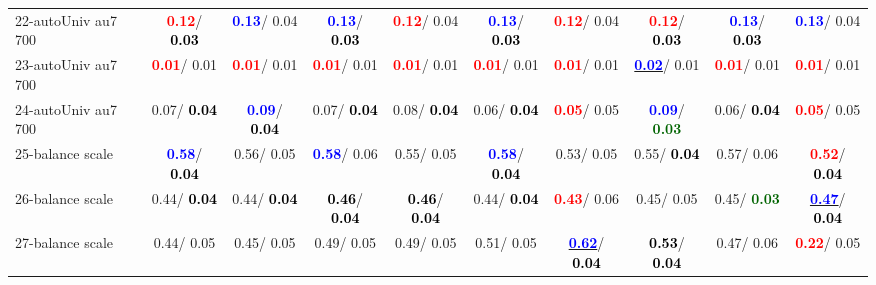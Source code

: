 \begin{table}[h]
\begin{center}
{\begin{tabular}{lc|c|c|c|c|c|c|c|c}
22-autoUniv au7 700 & \textcolor{red}{\textbf{  0.12}}/\textcolor{black}{\textbf{  0.03}} & \textcolor{blue}{\textbf{  0.13}}/  0.04 & \textcolor{blue}{\textbf{  0.13}}/\textcolor{black}{\textbf{  0.03}} & \textcolor{red}{\textbf{  0.12}}/  0.04 & \textcolor{blue}{\textbf{  0.13}}/\textcolor{black}{\textbf{  0.03}} & \textcolor{red}{\textbf{  0.12}}/  0.04 & \textcolor{red}{\textbf{  0.12}}/\textcolor{black}{\textbf{  0.03}} & \textcolor{blue}{\textbf{  0.13}}/\textcolor{black}{\textbf{  0.03}} & \textcolor{blue}{\textbf{  0.13}}/  0.04 \\
23-autoUniv au7 700 & \textcolor{red}{\textbf{  0.01}}/  0.01 & \textcolor{red}{\textbf{  0.01}}/  0.01 & \textcolor{red}{\textbf{  0.01}}/  0.01 & \textcolor{red}{\textbf{  0.01}}/  0.01 & \textcolor{red}{\textbf{  0.01}}/  0.01 & \textcolor{red}{\textbf{  0.01}}/  0.01 & \underline{\textcolor{blue}{\textbf{  0.02}}}/  0.01 & \textcolor{red}{\textbf{  0.01}}/  0.01 & \textcolor{red}{\textbf{  0.01}}/  0.01 \\
24-autoUniv au7 700 &   0.07/\textcolor{black}{\textbf{  0.04}} & \textcolor{blue}{\textbf{  0.09}}/\textcolor{black}{\textbf{  0.04}} &   0.07/\textcolor{black}{\textbf{  0.04}} &   0.08/\textcolor{black}{\textbf{  0.04}} &   0.06/\textcolor{black}{\textbf{  0.04}} & \textcolor{red}{\textbf{  0.05}}/  0.05 & \textcolor{blue}{\textbf{  0.09}}/\textcolor{darkgreen}{\textbf{  0.03}} &   0.06/\textcolor{black}{\textbf{  0.04}} & \textcolor{red}{\textbf{  0.05}}/  0.05 \\
25-balance scale & \textcolor{blue}{\textbf{  0.58}}/\textcolor{black}{\textbf{  0.04}} &   0.56/  0.05 & \textcolor{blue}{\textbf{  0.58}}/  0.06 &   0.55/  0.05 & \textcolor{blue}{\textbf{  0.58}}/\textcolor{black}{\textbf{  0.04}} &   0.53/  0.05 &   0.55/\textcolor{black}{\textbf{  0.04}} &   0.57/  0.06 & \textcolor{red}{\textbf{  0.52}}/\textcolor{black}{\textbf{  0.04}} \\
26-balance scale &   0.44/\textcolor{black}{\textbf{  0.04}} &   0.44/\textcolor{black}{\textbf{  0.04}} & \textcolor{black}{\textbf{  0.46}}/\textcolor{black}{\textbf{  0.04}} & \textcolor{black}{\textbf{  0.46}}/\textcolor{black}{\textbf{  0.04}} &   0.44/\textcolor{black}{\textbf{  0.04}} & \textcolor{red}{\textbf{  0.43}}/  0.06 &   0.45/  0.05 &   0.45/\textcolor{darkgreen}{\textbf{  0.03}} & \underline{\textcolor{blue}{\textbf{  0.47}}}/\textcolor{black}{\textbf{  0.04}} \\
27-balance scale &   0.44/  0.05 &   0.45/  0.05 &   0.49/  0.05 &   0.49/  0.05 &   0.51/  0.05 & \underline{\textcolor{blue}{\textbf{  0.62}}}/\textcolor{black}{\textbf{  0.04}} & \textcolor{black}{\textbf{  0.53}}/\textcolor{black}{\textbf{  0.04}} &   0.47/  0.06 & \textcolor{red}{\textbf{  0.22}}/  0.05 \\

\end{tabular}}
\end{center}
\end{table}
